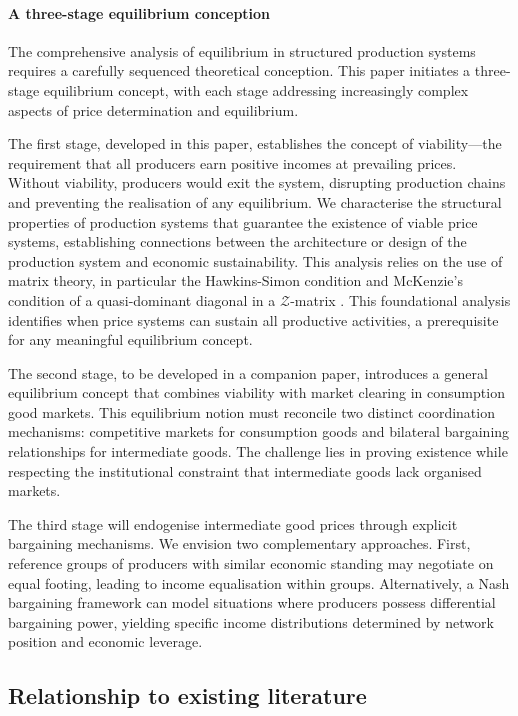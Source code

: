 \documentclass[11pt,fleqn]{article}
\begin{document}
\paragraph{A three-stage equilibrium conception}

The comprehensive analysis of equilibrium in structured production systems requires a carefully sequenced theoretical conception. This paper initiates a three-stage equilibrium concept, with each stage addressing increasingly complex aspects of price determination and equilibrium.

The first stage, developed in this paper, establishes the concept of viability---the requirement that all producers earn positive incomes at prevailing prices. Without viability, producers would exit the system, disrupting production chains and preventing the realisation of any equilibrium. We characterise the structural properties of production systems that guarantee the existence of viable price systems, establishing connections between the architecture or design of the production system and economic sustainability. This analysis relies on the use of matrix theory, in particular the Hawkins-Simon condition \citep{HawkinsSimon1949} and McKenzie's condition of a quasi-dominant diagonal in a $\mathcal Z$-matrix \citep{McKenzie1960}. This foundational analysis identifies when price systems can sustain all productive activities, a prerequisite for any meaningful equilibrium concept.

The second stage, to be developed in a companion paper, introduces a general equilibrium concept that combines viability with market clearing in consumption good markets. This equilibrium notion must reconcile two distinct coordination mechanisms: competitive markets for consumption goods and bilateral bargaining relationships for intermediate goods. The challenge lies in proving existence while respecting the institutional constraint that intermediate goods lack organised markets.

The third stage will endogenise intermediate good prices through explicit bargaining mechanisms. We envision two complementary approaches. First, reference groups of producers with similar economic standing may negotiate on equal footing, leading to income equalisation within groups. Alternatively, a Nash bargaining framework can model situations where producers possess differential bargaining power, yielding specific income distributions determined by network position and economic leverage.

\subsection{Relationship to existing literature}
\end{document}
